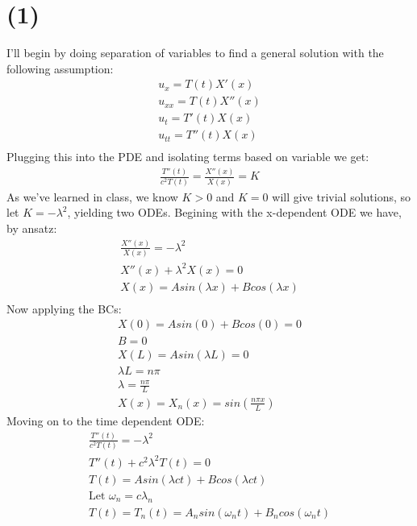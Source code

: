 \documentclass{article}
\begin{document}
\section*{\textbf{(1)}}
I'll begin by doing separation of variables to find a general solution with the following assumption:
\begin{equation}
\begin{aligned}
u_x = T(t)X'(x)\\
u_{xx} = T(t)X''(x)\\
u_t = T'(t)X(x)\\
u_{tt} = T''(t)X(x)\\
\end{aligned}
\end{equation}
Plugging this into the PDE and isolating terms based on variable we get:
\begin{equation}
\begin{aligned}
\frac{T''(t)}{c^2T(t)} = \frac{X''(x)}{X(x)} = K
\end{aligned}
\end{equation}
As we've learned in class, we know $K>0$ and $K=0$ will give trivial solutions, so let $K = -\lambda^2$, yielding two ODEs. Begining with the x-dependent ODE we have, by ansatz:
\begin{equation}
\begin{aligned}
\frac{X''(x)}{X(x)} = -\lambda^2\\
X''(x) + \lambda^2X(x) = 0\\
X(x) = Asin(\lambda x) + Bcos(\lambda x)\\
\end{aligned}
\end{equation}
Now applying the BCs:
\begin{equation}
\begin{aligned}
X(0) = Asin(0) + Bcos(0) = 0\\
B = 0\\
X(L) = Asin(\lambda L) = 0\\
\lambda L = n\pi \\
\lambda = \frac{n\pi}{L}\\
X(x) = X_n(x) = sin(\frac{n\pi x}{L})
\end{aligned}
\end{equation}
Moving on to the time dependent ODE:
\begin{equation}
\begin{aligned}
\frac{T''(t)}{c^2T(t)}= -\lambda^2\\
T''(t) + c^2\lambda^2 T(t) = 0\\
T(t) = Asin(\lambda ct) + Bcos(\lambda ct)\\
\text{Let $\omega_n = c\lambda_n$}\\
T(t) = T_n(t) = A_nsin(\omega_n t) + B_ncos(\omega_n t)
\end{aligned}
\end{equation}
\end{document}
